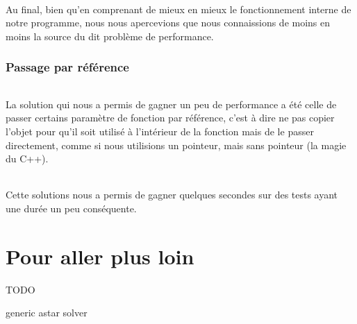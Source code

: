 \documentclass[french]{article}
\begin{document}
\paragraph{} Au final, bien qu'en comprenant de mieux en mieux le
fonctionnement interne de notre programme, nous nous apercevions que nous
connaissions de moins en moins la source du dit problème de performance.

\section{Passage par référence}

\paragraph{} La solution qui nous a permis de gagner un peu de performance a
été celle de passer certains paramètre de fonction par référence, c'est à dire
ne pas copier l'objet pour qu'il soit utilisé à l'intérieur de la fonction mais
de le passer directement, comme si nous utilisions un pointeur, mais sans
pointeur (la magie du C++).

\paragraph{} Cette solutions nous a permis de gagner quelques secondes sur des
tests ayant une durée un peu conséquente.

\part{Pour aller plus loin}

{\Huge TODO}

generic astar solver

\printbibliography%
\end{document}
